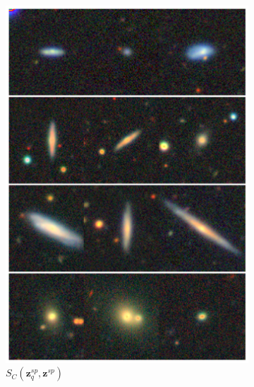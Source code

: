 \documentclass[a4paper,12pt]{article}
\begin{document}
\begin{figure}[H]
\begin{subfigure}{0.22\textwidth}
        \includegraphics[height=0.21\textheight]{../figures/images_sp_sp.png}
        \caption{$S_C(\mathbf{z}_q^{sp}, \mathbf{z}^{sp})$}
        \label{fig:retrieval_3}
    \end{subfigure}%
    \hfill
    \begin{subfigure}{0.22\textwidth}
        \centering

\end{subfigure}
\end{figure}
\end{document}
